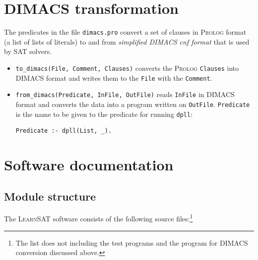 \documentclass[11pt]{article}
\newcommand*{\p}[1]{\textup{\texttt{#1}}}
\newcommand*{\ls}{\textsc{LearnSAT}}
\newcommand*{\pl}{\textsc{Prolog}}
\begin{document}
\section{DIMACS transformation}

The predicates in the file \p{dimacs.pro} convert a set of clauses in
\pl{} format (a list of lists of literals) to and from \emph{simplified
DIMACS cnf format} that is used by SAT solvers.
\begin{itemize}
\item \p{to\_dimacs(File, Comment, Clauses)} converts the \pl{}
\p{Clauses} into DIMACS format and writes them to the \p{File} with the
\p{Comment}.
\item \p{from\_dimacs(Predicate, InFile, OutFile)} reads \p{InFile} in
DIMACS format and converts the data into a program written on
\p{OutFile}. \p{Predicate} is the name to be given to the predicate for
running \p{dpll}:
\begin{verbatim}
Predicate :- dpll(List, _).
\end{verbatim}
\end{itemize}

\newpage

\section{Software documentation}

\subsection{Module structure}

The \ls{} software consists of the following source files:\footnote{The
list does not including the test programs and the program for DIMACS
conversion discussed above.}
\end{document}
